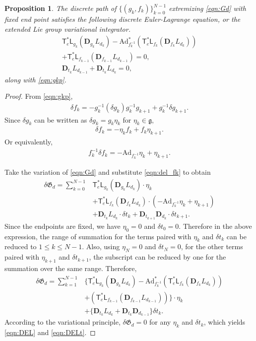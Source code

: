 \documentclass[letterpaper, 10pt, conference]{ieeeconf}
\newcommand{\T}{\ensuremath{\mathsf{T}}}
\renewcommand{\L}{\ensuremath{\mathsf{L}}}
\newcommand{\D}{\ensuremath{\mathbf{D}}}
\newcommand{\Ad}{\ensuremath{\mathrm{Ad}}}
\newcommand{\g}{\ensuremath{\mathfrak{g}}}
\newtheorem{prop}{Proposition}
\begin{document}
\begin{prop}
    The discrete path of $\{(g_k,f_k)\}_{k=0}^{N-1}$ extremizing \eqref{eqn:Gd} with fixed end point satisfies the following discrete Euler-Lagrange equation, or the extended Lie group variational integrator.
    \begin{gather}
        \T^*_e\L_{g_k}(\D_{g_k} L_{d_k})- \Ad^*_{f_k^{-1}} (\T^*_e\L_{f_k}(\D_{f_k} L_{d_k}))\nonumber \\
        + \T^*_e\L_{f_{k-1}}(\D_{f_{k-1}} L_{d_{k-1}}) =0,\label{eqn:DEL}\\
        \D_{t_k} L_{d_{k-1}} + \D_{t_k} L_{d_k} = 0, \label{eqn:DELt}
    \end{gather}
    along with \eqref{eqn:gkp}.
\end{prop}
\begin{proof}
    From \eqref{eqn:gkp},
    \begin{align*}
        \delta f_k = - g_k^{-1}( \delta g_k ) g_k^{-1} g_{k+1} + g_k^{-1}\delta g_{k+1}.
    \end{align*}
    Since $\delta g_k$ can be written as $\delta g_k = g_k \eta_k $ for $\eta_k\in \g$, 
    \begin{align*}
        \delta f_k = - \eta_k f_k +f_k \eta_{k+1}.
    \end{align*}
    Or equivalently, 
    \begin{align}
        f_k^{-1}\delta f_k = -\Ad_{f_k^{-1}} \eta_k + \eta_{k+1}.\label{eqn:del_fk}
    \end{align}

    Take the variation of \eqref{eqn:Gd} and substitute \eqref{eqn:del_fk} to obtain
    \begin{align*}
        \delta \mathfrak{G}_d  = \sum_{k=0}^{N-1}
        & \T^*_e\L_{g_k}(\D_{g_k} L_{d_k}) \cdot \eta_k \\
        & + \T^*_e\L_{f_k}(\D_{f_k} L_{d_k}) \cdot (-\Ad_{f_k^{-1}} \eta_k + \eta_{k+1}) \\
        & + \D_{t_k} L_{d_k}\cdot \delta t_k + \D_{t_{k+1}} \D_{d_k}\cdot \delta t_{k+1}.
    \end{align*}
    Since the endpoints are fixed, we have $\eta_0=0$ and $\delta t_0 = 0$.
    Therefore in the above expression, the range of summation for the terms paired with $\eta_k$ and $\delta t_k$ can be reduced to $1\leq k\leq N-1$. 
    Also, using $\eta_N=0$ and $\delta t_N=0$, for the other terms paired with $\eta_{k+1}$ and $\delta t_{k+1}$, the subscript can be reduced by one for the summation over the same range.
    Therefore, 
    \begin{align*}
        \delta \mathfrak{G}_d  = \sum_{k=1}^{N-1}
        & \big\{ \T^*_e\L_{g_k}(\D_{g_k} L_{d_k})- \Ad^*_{f_k^{-1}} (\T^*_e\L_{f_k}(\D_{f_k} L_{d_k})) \\
        & + (\T^*_e\L_{f_{k-1}}(\D_{f_{k-1}} L_{d_{k-1}})) \big\} \cdot \eta_{k} \\
        & + \{ \D_{t_k} L_{d_k} + \D_{t_{k}} \D_{d_{k-1}} \} \delta t_k.
    \end{align*}
    According to the variational principle, $\delta\mathfrak{G}_d = 0$ for any $\eta_k$ and $\delta t_k$, which yields \eqref{eqn:DEL} and \eqref{eqn:DELt}.
\end{proof}
\end{document}
